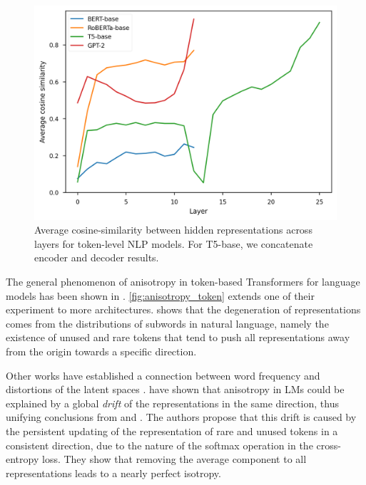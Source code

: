 \begin{figure}[ht]
    \centering
     \includegraphics[width=0.9\columnwidth]{sources/part_1/anisotropy/imgs/cosine_token.png}
     \caption{Average cosine-similarity between hidden representations across layers for token-level NLP models. For T5-base, we concatenate encoder and decoder results.}
     \label{fig:anisotropy_token}
\end{figure}

The general phenomenon of anisotropy in token-based Transformers for language models has been shown in \citet{ethayarajh-2019-contextual}. \autoref{fig:anisotropy_token} extends one of their experiment to more architectures. \citet{gao2018representation} shows that the degeneration of representations comes from the distributions of subwords in natural language, namely the existence of unused and rare tokens that tend to push all representations away from the origin towards a specific direction.

Other works have established a connection between word frequency and distortions of the latent spaces \citep{yu-etal-2022-rare, puccetti-etal-2022-outlier, rajaee-pilehvar-2022-isotropy}. \citet{bis-etal-2021-much} have shown that anisotropy in LMs could be explained by a global \textit{drift} of the representations in the same direction, thus unifying conclusions from \citet{ethayarajh-2019-contextual} and \citet{gao2018representation}. The authors propose that this drift is caused by the persistent updating of the representation of rare and unused tokens in a consistent direction, due to the nature of the softmax operation in the cross-entropy loss. They show that removing the average component to all representations leads to a nearly perfect isotropy.

